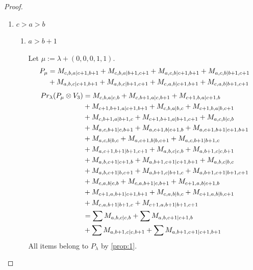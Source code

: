 \begin{proof}
\begin{enumerate}
  \item $c>a>b$
    \begin{enumerate}
      \item $a>b+1$\par
        Let $\mu:=\lambda + (0,0,0,1,1) $.
        \begin{equation}\notag
          \begin{aligned}
            P_\mu &= M_{c,b,a|c+1,b+1}
+ M_{c,b,a|b+1,c+1}
+ M_{a,c,b|c+1,b+1}
+ M_{a,c,b|b+1,c+1}\\
                                              &
+ M_{a,b,c|c+1,b+1}
+ M_{a,b,c|b+1,c+1}
+ M_{c,a,b|c+1,b+1}
+ M_{c,a,b|b+1,c+1}
          \end{aligned}
        \end{equation}
        \begin{equation}\notag
          \begin{aligned}
            Pr_{\lambda}(P_\mu \otimes V_{3}) &=
M_{c,b,a|c,b}
+ M_{c,b+1,a|c,b+1}
+ M_{c+1,b,a|c+1,b}\\
                                              &
+ M_{c+1,b+1,a|c+1,b+1}
+ M_{c,b,a|b,c}
+ M_{c+1,b,a|b,c+1}\\
                                              &
+ M_{c,b+1,a|b+1,c}
+ M_{c+1,b+1,a|b+1,c+1}
+ M_{a,c,b|c,b}\\
                                              &
+ M_{a,c,b+1|c,b+1}
+ M_{a,c+1,b|c+1,b}
+ M_{a,c+1,b+1|c+1,b+1}\\
                                              &
+ M_{a,c,b|b,c}
+ M_{a,c+1,b|b,c+1}
+ M_{a,c,b+1|b+1,c}\\
                                              &
+ M_{a,c+1,b+1|b+1,c+1}
+ M_{a,b,c|c,b}
+ M_{a,b+1,c|c,b+1}\\
                                              &
+ M_{a,b,c+1|c+1,b}
+ M_{a,b+1,c+1|c+1,b+1}
+ M_{a,b,c|b,c}\\
                                              &
+ M_{a,b,c+1|b,c+1}
+ M_{a,b+1,c|b+1,c}
+ M_{a,b+1,c+1|b+1,c+1}\\
                                              &
+ M_{c,a,b|c,b}
+ M_{c,a,b+1|c,b+1}
+ M_{c+1,a,b|c+1,b}\\
                                              &
+ M_{c+1,a,b+1|c+1,b+1}
+ M_{c,a,b|b,c}
+ M_{c+1,a,b|b,c+1}\\
                                              &
+ M_{c,a,b+1|b+1,c}
+ M_{c+1,a,b+1|b+1,c+1} \\
                                               &=
\sum M_{a,b,c|c,b}
+ \sum M_{a,b,c+1|c+1,b}\\
                                              &
+ \sum M_{a,b+1,c|c,b+1}
+ \sum M_{a,b+1,c+1|c+1,b+1}
          \end{aligned}
        \end{equation}
All items belong to $P_\lambda$ by \cref{prop:1}.


\end{enumerate}
\end{enumerate}
\end{proof}
